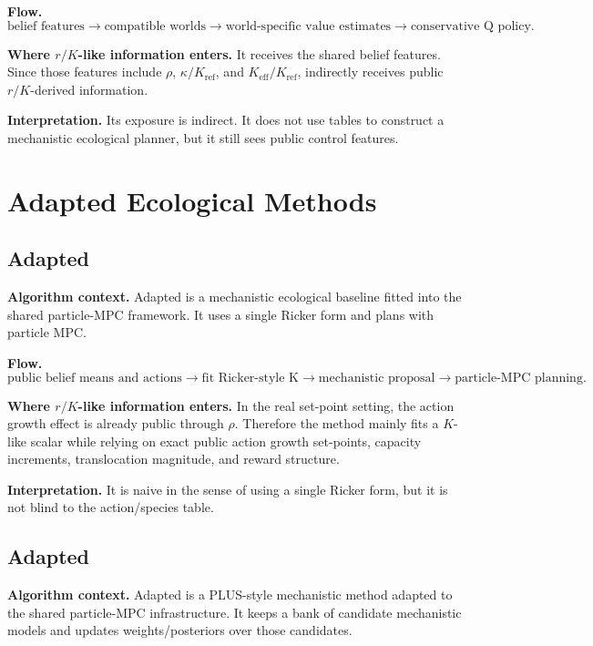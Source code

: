 \documentclass[11pt]{article}
\newcommand{\code}[1]{\texttt{\detokenize{#1}}}
\newcommand{\rhoctl}{\rho}
\newcommand{\kappactl}{\kappa}
\newcommand{\Keff}{K_{\mathrm{eff}}}
\newcommand{\Kref}{K_{\mathrm{ref}}}
\begin{document}
\textbf{Flow.}
\[
\text{belief features}
\rightarrow
\text{compatible worlds}
\rightarrow
\text{world-specific value estimates}
\rightarrow
\text{conservative Q policy}.
\]

\textbf{Where \(r/K\)-like information enters.} It receives the shared belief
features. Since those features include \(\rhoctl\), \(\kappactl/\Kref\), and
\(\Keff/\Kref\), \code{delphic} indirectly receives public \(r/K\)-derived
information.

\textbf{Interpretation.} Its exposure is indirect. It does not use tables to
construct a mechanistic ecological planner, but it still sees public control
features.

\section{Adapted Ecological Methods}

\subsection{Adapted \code{moor}}

\textbf{Algorithm context.} Adapted \code{moor} is a mechanistic ecological
baseline fitted into the shared particle-MPC framework. It uses a single Ricker
form and plans with particle MPC.

\textbf{Flow.}
\[
\text{public belief means and actions}
\rightarrow
\text{fit Ricker-style K}
\rightarrow
\text{mechanistic proposal}
\rightarrow
\text{particle-MPC planning}.
\]

\textbf{Where \(r/K\)-like information enters.} In the real set-point setting,
the action growth effect is already public through \(\rhoctl\). Therefore the
method mainly fits a \(K\)-like scalar while relying on exact public action
growth set-points, capacity increments, translocation magnitude, and reward
structure.

\textbf{Interpretation.} It is naive in the sense of using a single Ricker form,
but it is not blind to the action/species table.

\subsection{Adapted \code{plus}}

\textbf{Algorithm context.} Adapted \code{plus} is a PLUS-style mechanistic
method adapted to the shared particle-MPC infrastructure. It keeps a bank of
candidate mechanistic models and updates weights/posteriors over those
candidates.
\end{document}
